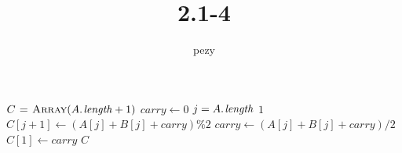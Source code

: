 \documentclass{article}
\begin{document}
	\title{2.1-4}
	\author{pezy}
	\maketitle
	\begin{codebox}
	\li $C \gets \proc{Array}(\attrib{A}{length}+1)$	
	\li $carry \gets 0$
	\li \For $j = \attrib{A}{length}$ \Downto $1$
	\li		\Do
				$C[j+1] \gets (A[j] + B[j] + carry) \% 2$
	\li			$carry \gets (A[j] + B[j] + carry) / 2$
			\End
	\li	$C[1] \gets carry$
	\li \Return $C$
	\end{codebox}
\end{document}
